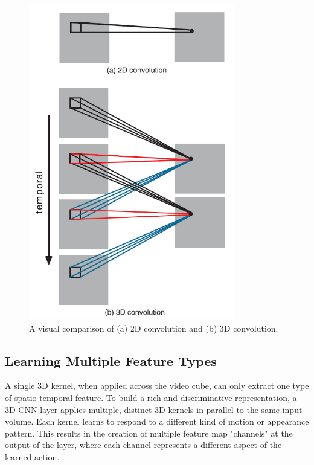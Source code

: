 \begin{figure}[H]
    \centering
    \includegraphics[width=0.8\textwidth]{archivos/figuras/comparison.jpg} 
    \caption{A visual comparison of (a) 2D convolution and (b) 3D convolution.}
    \label{fig:2d_vs_3d}
\end{figure}

\subsection{Learning Multiple Feature Types}
A single 3D kernel, when applied across the video cube, can only extract one type of spatio-temporal feature. To build a rich and discriminative representation, a 3D CNN layer applies multiple, distinct 3D kernels in parallel to the same input volume. Each kernel learns to respond to a different kind of motion or appearance pattern. This results in the creation of multiple feature map "channels" at the output of the layer, where each channel represents a different aspect of the learned action.

